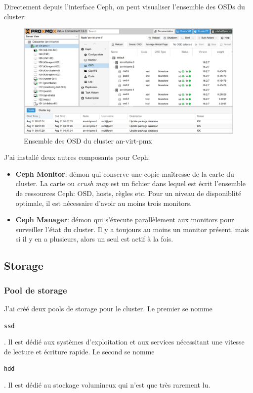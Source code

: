 \documentclass[12pt, a4paper, twoside]{article}
\begin{document}
Directement depuis l'interface \gls{Ceph}, on peut visualiser l'ensemble des \gls{OSD}s du \gls{cluster}:
\begin{figure}[ht!]
    \centering
        \includegraphics[width=\textwidth]{src/interface_proxmox_osd.png}
    \caption{Ensemble des \gls{OSD} du \gls{cluster} an-virt-pmx}
    \label{fig:osd_cluster}
\end{figure}

\newpage
J'ai installé deux autres composants pour \gls{Ceph}:
\begin{itemize}
    \item \textbf{\gls{Ceph} Monitor}: démon qui conserve une copie maîtresse de la carte du \gls{cluster}. 
    La carte ou \textit{crush map} est un fichier dans lequel est écrit l'ensemble de ressources \gls{Ceph}: \gls{OSD}, hosts, règles etc.
    Pour un niveau de disponiblité optimale, il est nécessaire d'avoir au moins trois monitors.
    \item \textbf{\gls{Ceph} Manager}: démon qui s'éxecute parallèlement aux monitors pour surveiller l'état du \gls{cluster}.
    Il y a toujours au moins un monitor présent, mais si il y en a plusieurs, alors un seul est actif à la fois.
\end{itemize}

\subsection{Storage}
\subsubsection{Pool de storage}
J'ai créé deux pools de storage pour le \gls{cluster}.
Le premier se nomme \begin{code}\texttt{ssd}\end{code}. 
Il est dédié aux systèmes d'exploitation et aux services nécessitant une vitesse de lecture et écriture rapide.
Le second se nomme \begin{code}\texttt{hdd}\end{code}.
Il est dédié au stockage volumineux qui n'est que très rarement lu.
\end{document}
